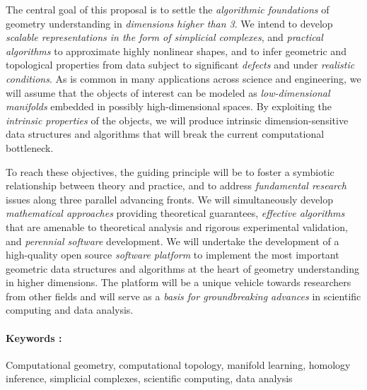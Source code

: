 
The central goal of this proposal is to settle the {\em algorithmic
foundations} of geometry understanding in {\em dimensions higher than
3}.  We intend to develop {\em scalable representations  in the form of simplicial complexes}, and {\em
practical algorithms} to approximate highly nonlinear shapes, and to
infer geometric and topological properties from data subject to
significant {\em defects} and under {\em realistic conditions}.
As is common in many applications across science and engineering, we
will assume that the objects of interest can be modeled as {\em
  low-dimensional manifolds} embedded in possibly high-dimensional
spaces. By exploiting the {\em intrinsic properties} of the objects,
we will produce intrinsic dimension-sensitive data structures and algorithms
that will break the current computational
bottleneck.

To reach these objectives, the guiding principle will be to foster a
symbiotic relationship between theory and practice, and to address
{\em fundamental research} issues along three parallel advancing
fronts. We will simultaneously develop {\em mathematical approaches}
providing theoretical guarantees, {\em effective algorithms} that are
amenable to theoretical analysis and rigorous experimental validation,
and {\em perennial software} development.  We will undertake the
development of a high-quality open source {\em software platform} to
implement the most important geometric data structures and algorithms
at the heart of geometry understanding in higher dimensions. The
platform will be a unique vehicle towards researchers from other
fields and will serve as a {\em basis for groundbreaking advances} in
scientific computing and data analysis.



\paragraph{Keywords :} Computational geometry, computational topology,
manifold learning, homology inference, simplicial complexes,
scientific computing, data analysis
